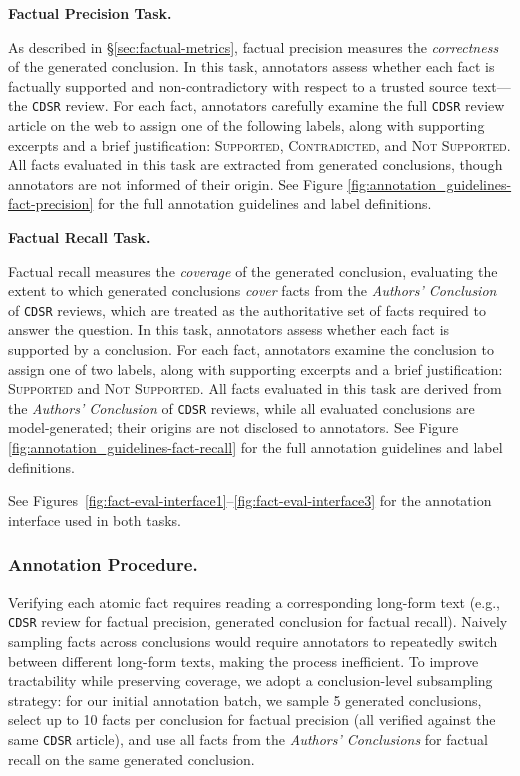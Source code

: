 \documentclass{article}
\newcommand{\xhdr}[1]{%
  \noindent\textbf{#1.}
}
\begin{document}
\xhdr{Factual Precision Task}
As described in \S\ref{sec:factual-metrics}, factual precision measures the \textit{correctness} of the generated conclusion. In this task, annotators assess whether each fact is factually supported and non-contradictory with respect to a trusted source text---the \texttt{CDSR} review. For each fact, annotators carefully examine the full \texttt{CDSR} review article on the web to assign one of the following labels, along with supporting excerpts and a brief justification: \textsc{Supported}, \textsc{Contradicted}, and \textsc{Not Supported}. All facts evaluated in this task are extracted from generated conclusions, though annotators are not informed of their origin. See Figure \ref{fig:annotation_guidelines-fact-precision} for the full annotation guidelines and label definitions.

\xhdr{Factual Recall Task}
Factual recall measures the \textit{coverage} of the generated conclusion, evaluating the extent to which generated conclusions \textit{cover} facts from the \textit{Authors' Conclusion} of \texttt{CDSR} reviews, which are treated as the authoritative set of facts required to answer the question.  In this task, annotators assess whether each fact is supported by a conclusion. For each fact, annotators examine the conclusion to assign one of two labels, along with supporting excerpts and a brief justification: \textsc{Supported} and \textsc{Not Supported}. All facts evaluated in this task are derived from the \textit{Authors' Conclusion} of \texttt{CDSR} reviews, while all evaluated conclusions are model-generated; their origins are not disclosed to annotators.  See Figure \ref{fig:annotation_guidelines-fact-recall} for the full annotation guidelines and label definitions.

See Figures~\ref{fig:fact-eval-interface1}--\ref{fig:fact-eval-interface3} for the annotation interface used in both tasks.






\subsubsection{Annotation Procedure.}\label{appendix:fact-eval-annotation-procedure} Verifying each atomic fact requires reading a corresponding long-form text (e.g., \texttt{CDSR} review for factual precision, generated conclusion for factual recall). Naively sampling facts across conclusions would require annotators to repeatedly switch between different long-form texts, making the process inefficient. To improve tractability while preserving coverage, we adopt a conclusion-level subsampling strategy: for our initial annotation batch, we sample 5 generated conclusions, select up to 10 facts per conclusion for factual precision (all verified against the same \texttt{CDSR} article), and use all facts from the \textit{Authors' Conclusions} for factual recall on the same generated conclusion. 
\end{document}
